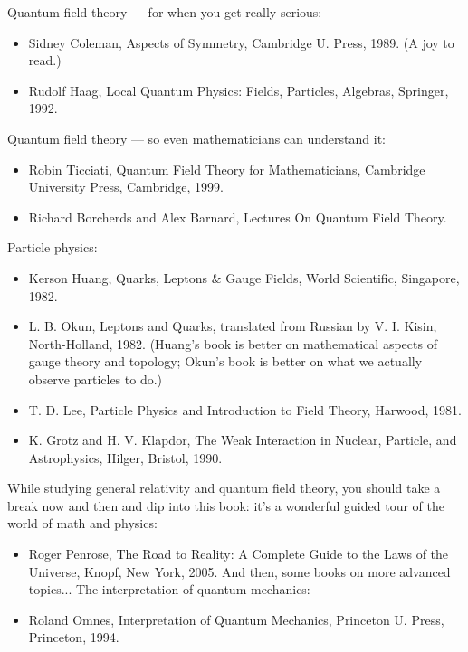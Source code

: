 \documentclass[10pt,a4paper]{book}
\theoremstyle{definition}
\begin{document}
Quantum field theory — for when you get really serious:
\begin{itemize}
\item  Sidney Coleman, Aspects of Symmetry, Cambridge U. Press, 1989. (A joy to read.)
\item Rudolf Haag, Local Quantum Physics: Fields, Particles, Algebras, Springer, 1992.
\end{itemize}

Quantum field theory — so even mathematicians can understand it:

\begin{itemize}
\item  Robin Ticciati, Quantum Field Theory for Mathematicians, Cambridge University Press, Cambridge, 1999.
\item Richard Borcherds and Alex Barnard, Lectures On Quantum Field Theory.
\end{itemize}

Particle physics:

\begin{itemize}
\item  Kerson Huang, Quarks, Leptons \& Gauge Fields, World Scientific, Singapore, 1982.
\item L. B. Okun, Leptons and Quarks, translated from Russian by V. I. Kisin, North-Holland, 1982. (Huang's book is better on mathematical aspects of gauge theory and topology; Okun's book is better on what we actually observe particles to do.)
\item T. D. Lee, Particle Physics and Introduction to Field Theory, Harwood, 1981.
\item K. Grotz and H. V. Klapdor, The Weak Interaction in Nuclear, Particle, and Astrophysics, Hilger, Bristol, 1990.
\end{itemize}


While studying general relativity and quantum field theory, you should take a break now and then and dip into this book: it's a wonderful guided tour of the world of math and physics:

\begin{itemize}
\item  Roger Penrose, The Road to Reality: A Complete Guide to the Laws of the Universe, Knopf, New York, 2005.
And then, some books on more advanced topics...
The interpretation of quantum mechanics:

\item Roland Omnes, Interpretation of Quantum Mechanics, Princeton U. Press, Princeton, 1994.
\end{itemize}
\end{document}
